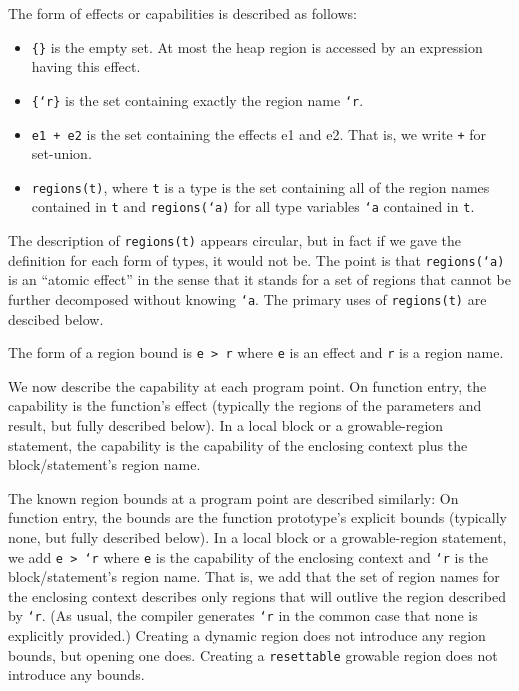 The form of effects or capabilities is described as follows:
\begin{itemize}
\item \texttt{\{\}} is the empty set.  At most the heap region
  is accessed by an expression having this effect.
\item \texttt{\{`r\}} is the set containing exactly the region name
  \texttt{`r}.
\item \texttt{e1 + e2} is the set containing the effects e1 and e2.
  That is, we write \texttt{+} for set-union.
\item \texttt{regions(t)}, where \texttt{t} is a type is the set
  containing all of the region names contained in \texttt{t} and
  \texttt{regions(`a)} for all type variables \texttt{`a} contained in
  \texttt{t}.
\end{itemize}
The description of \texttt{regions(t)} appears circular, but in fact
if we gave the definition for each form of types, it would not be.
The point is that \texttt{regions(`a)} is an ``atomic effect'' in the
sense that it stands for a set of regions that cannot be further
decomposed without knowing \texttt{`a}.  The primary uses of
\texttt{regions(t)} are descibed below.

The form of a region bound is \texttt{e > r} where \texttt{e} is an
effect and \texttt{r} is a region name.

We now describe the capability at each program point.  On function
entry, the capability is the function's effect (typically the regions
of the parameters and result, but fully described below).  In
a local block or a growable-region statement, the capability is the
capability of the enclosing context plus the block/statement's region
name.

The known region bounds at a program point are described similarly: On
function entry, the bounds are the function prototype's explicit
bounds (typically none, but fully described below).  In a local block
or a growable-region statement, we add \texttt{e > `r} where
\texttt{e} is the capability of the enclosing context and \texttt{`r}
is the block/statement's region name.  That is, we add that the set of
region names for the enclosing context describes only regions that
will outlive the region described by \texttt{`r}.  (As usual, the
compiler generates \texttt{`r} in the common case that none is
explicitly provided.)  Creating a dynamic region does not introduce
any region bounds, but opening one does.  Creating a
\texttt{resettable} growable region does not introduce any bounds.

